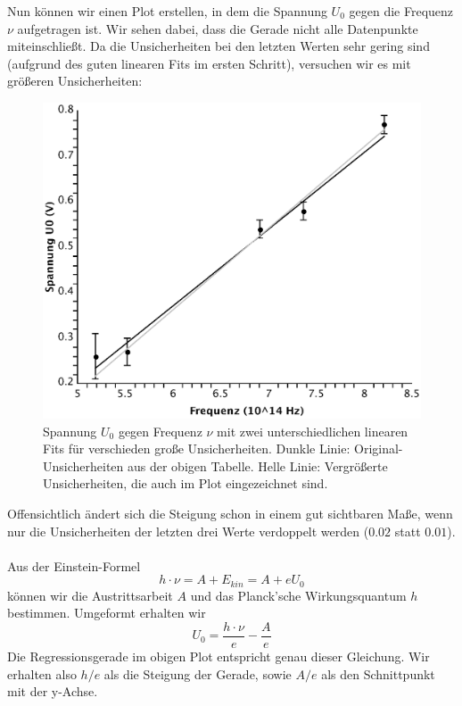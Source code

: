 \documentclass[12pt,a4paper,twopage]{article}
\begin{document}
\newpage
Nun können wir einen  Plot erstellen, in dem die Spannung $U_0$ gegen die Frequenz $\nu$ aufgetragen ist. Wir sehen dabei, dass die Gerade nicht alle Datenpunkte miteinschließt. Da die Unsicherheiten bei den letzten Werten sehr gering sind (aufgrund des guten linearen Fits im ersten Schritt), versuchen wir es mit größeren Unsicherheiten:
\begin{center}
\begin{figure}[H]
\includegraphics[scale=0.75]{frequenz-spannung-unterschied.eps}
\caption{Spannung $U_0$ gegen Frequenz $\nu$ mit zwei unterschiedlichen linearen Fits für verschieden große Unsicherheiten. Dunkle Linie: Original-Unsicherheiten aus der obigen Tabelle. Helle Linie: Vergrößerte Unsicherheiten, die auch im Plot eingezeichnet sind.}
\end{figure}
\end{center}

Offensichtlich ändert sich die Steigung schon in einem gut sichtbaren Maße, wenn nur die Unsicherheiten der letzten drei Werte verdoppelt werden ($0.02$ statt $0.01$).\\
\\
Aus der Einstein-Formel 
$$h\cdot\nu=A+E_{kin}=A+eU_0$$
können wir die Austrittsarbeit $A$ und das Planck'sche Wirkungsquantum $h$ bestimmen. Umgeformt erhalten wir
$$U_0=\frac{h\cdot\nu}{e} - \frac{A}{e}$$
Die Regressionsgerade im obigen Plot entspricht genau dieser Gleichung. Wir erhalten also $h/e$ als die Steigung der Gerade, sowie $A/e$ als den Schnittpunkt mit der y-Achse.
\end{document}

